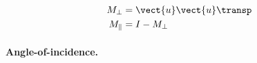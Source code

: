 \begin{subequations}
    \begin{align}
        M_\perp &= \vect{u} \vect{u}\transp
        \label{eq:perp_decomposition_matrix}
        \\
        M_\parallel & = I - M_\perp
        \label{eq:para_decomposition_matrix}
    \end{align}
    \label{eq:para_perp_decomposition_matrix}
\end{subequations}

\paragraph{Angle-of-incidence.}

